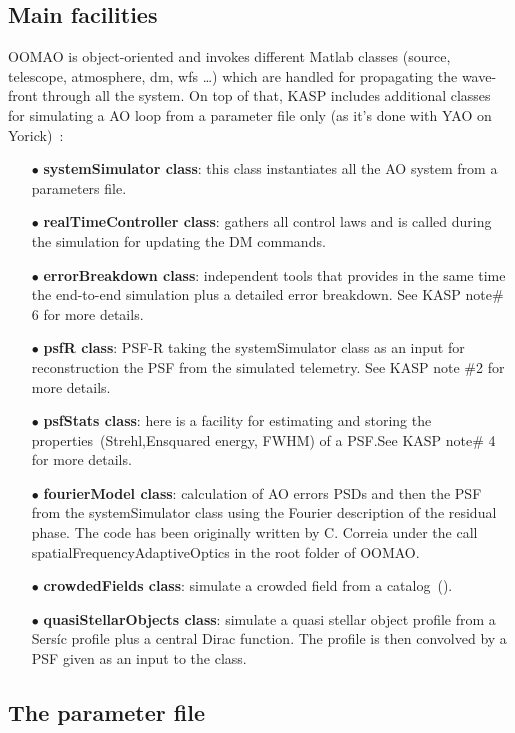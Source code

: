 \documentclass[12pt]{article}
\begin{document}
\subsection{Main facilities}
OOMAO is object-oriented and invokes different Matlab classes (source, telescope, atmosphere, dm, wfs …) which are handled for propagating the wave-front through all the system. On top of that, KASP includes additional classes for simulating a AO loop from a parameter file only (as it's done with YAO on Yorick)~:
\begin{itemize}
	\item[$\bullet$] \textbf{systemSimulator class}: this class instantiates all the AO system from a parameters file.
	\item[$\bullet$] \textbf{realTimeController class}: gathers all control laws and is called during the simulation for updating the DM commands.
	\item[$\bullet$] \textbf{errorBreakdown class}: independent tools that provides in the same time the end-to-end simulation plus a detailed error breakdown. See KASP note\# 6 for more details.
	\item[$\bullet$] \textbf{psfR class}: PSF-R taking the systemSimulator class as an input for reconstruction the PSF from the simulated telemetry. See KASP note \#2 for more details.
	\item[$\bullet$] \textbf{psfStats class}: here is a facility for estimating and storing the properties~(Strehl,Ensquared energy, FWHM) of a PSF.See KASP note\# 4 for more details.
	\item[$\bullet$]\textbf{fourierModel class}: calculation of AO errors PSDs and then the PSF from the systemSimulator class using the Fourier description of the residual phase. The code has been originally written by C. Correia under the call spatialFrequencyAdaptiveOptics in the root folder of OOMAO.	
	\item[$\bullet$] \textbf{crowdedFields class}: simulate a crowded field from a catalog~(\cite{Ascenso 2015}).
	\item[$\bullet$] \textbf{quasiStellarObjects class}: simulate a quasi stellar object profile from a Sersíc profile plus a central Dirac function. The profile is then convolved by a PSF given as an input to the class.	
\end{itemize}

\subsection{The parameter file}
\end{document}
